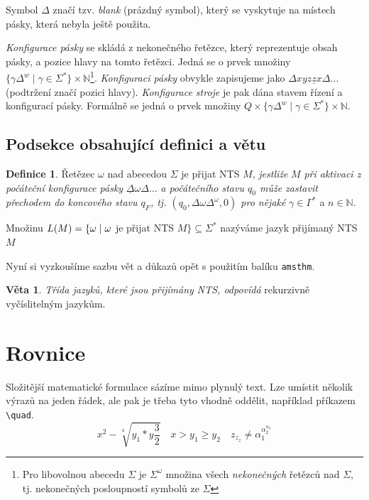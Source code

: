 \documentclass[a4paper,11pt]{article}
\theoremstyle{definition}
\newtheorem{theorem}{Definice}
\newtheorem{veta}{Věta}
\begin{document}
Symbol $\Delta$ značí tzv. \emph{blank} (prázdný symbol), který se vyskytuje na místech pásky, která nebyla ještě použita.

\emph{Konfigurace pásky} se skládá z nekonečného řetězce, který reprezentuje obsah pásky, a pozice hlavy na tomto řetězci. Jedná se o prvek množiny ${\{\gamma \Delta^w \mid \gamma \in \Sigma^\ast\}\times \mathbb{N}}$\footnote{Pro libovolnou abecedu $\Sigma$ je $\Sigma^\omega$ množina všech \emph{nekonečných} řetězců nad $\Sigma$, tj. nekonečných posloupností symbolů ze $\Sigma$}.
\emph{Konfiguraci pásky} obvykle zapisujeme jako ${\Delta xyz\underline{z}x\Delta \dots}$ (podtržení značí pozici hlavy).
\emph{Konfigurace stroje} je pak dána stavem řízení a konfigurací pásky. Formálně se jedná o prvek množiny ${Q \times \{\gamma \Delta^w \mid \gamma \in \Sigma^\ast\}\times \mathbb{N}}$.

\subsection{Podsekce obsahující definici a větu}

\begin{theorem}\label{def2}
Řetězec $\omega$ nad abecedou $\Sigma$ je přijat NTS  $M$, \emph{jestliže} $M$ \emph{při aktivaci z počáteční konfigurace pásky} ${\underline{\Delta} \omega \Delta \dots}$ \emph{a počátečního stavu $q_0$ může zastavit přechodem do koncového stavu $q_F$, tj. $(q_0, \Delta \omega \Delta^\omega, 0)$ pro nějaké} $\gamma \in \Gamma^\ast$ a $n \in \mathbb{N}$.

Množinu $\mathnormal{L(M)} = \{ \omega \;|\; \omega $ je přijat NTS $M\}\subseteq \Sigma^\ast$ nazýváme jazyk přijímaný NTS $M$
\end{theorem}
Nyní si vyzkoušíme sazbu vět a důkazů opět s použitím balíku \texttt{amsthm}.

\begin{veta}\emph{Třída jazyků, které jsou přijímány NTS, odpovídá} rekurzivně vyčíslitelným jazykům.
\end{veta}


\section{Rovnice}

Složitější matematické formulace sázíme mimo plynulý text. Lze umístit několik výrazů na jeden řádek, ale pak je třeba tyto vhodně oddělit, například příkazem \verb|\quad|.
$$x^2 - \sqrt[4]{y_1 \ast y\frac{3}{2}} \quad x >y_1\geq y_2 \quad z_{z_{z}} \neq \alpha_1^{\alpha_2^{\alpha_3}}$$
\end{document}

